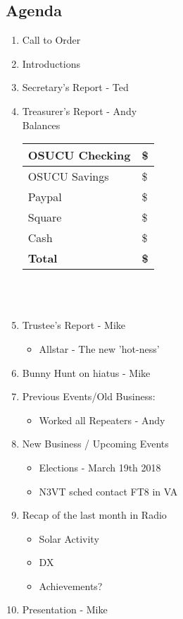 \documentclass[letter,11pt]{extarticle}
\begin{document}
	\subsection*{Agenda}
	\begin{enumerate}
		\item Call to Order
		\item Introductions
		\item Secretary's Report - Ted
		\item Treasurer's Report - Andy \\
				Balances \\
			\begin{tabular}{|l|l|} \hline
				OSUCU Checking & \$ \\ \hline
				OSUCU Savings & \$ \\ \hline
				Paypal & \$ \\ \hline
				Square & \$ \\ \hline
				Cash & \$  \\ \hline
				\textbf{Total} & \textbf{\$} \\ \hline
			\end{tabular} \\ \\
		\item Trustee's Report - Mike
			\begin{itemize}
				\item Allstar - The new 'hot-ness'
			\end{itemize}
		\item Bunny Hunt on hiatus - Mike
		\item Previous Events/Old Business:
			\begin{itemize}
				\item Worked all Repeaters - Andy
			\end{itemize}
		\item  New Business / Upcoming Events
			\begin{itemize}
				\item Elections - March 19th 2018
				\item N3VT sched contact FT8 in VA
			\end{itemize}
		\item Recap of the last month in Radio
			\begin{itemize}
				\item Solar Activity
				\item DX
				\item Achievements?
			\end{itemize}
		\item  Presentation - Mike
	\end{enumerate}
\end{document}
